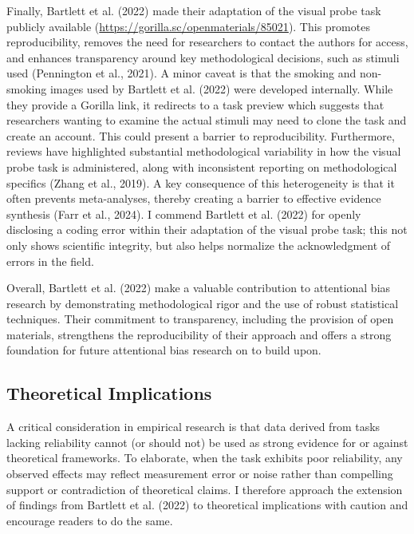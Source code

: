 \documentclass[authordate, reflection, issue]{jote-new-article}
\begin{document}
	Finally, Bartlett et al. (2022) made their adaptation of the visual probe task publicly available (\href{https://gorilla.sc/openmaterials/85021}{https://gorilla.sc/openmaterials/85021}). This promotes reproducibility, removes the need for researchers to contact the authors for access, and enhances transparency around key methodological decisions, such as stimuli used (Pennington et al., 2021). A minor caveat is that the smoking and non-smoking images used by Bartlett et al. (2022) were developed internally. While they provide a Gorilla link, it redirects to a task preview which suggests that researchers wanting to examine the actual stimuli may need to clone the task and create an account. This could present a barrier to reproducibility. Furthermore, reviews have highlighted substantial methodological variability in how the visual probe task is administered, along with inconsistent reporting on methodological specifics (Zhang et al., 2019). A key consequence of this heterogeneity is that it often prevents meta-analyses, thereby creating a barrier to effective evidence synthesis (Farr et al., 2024). I commend Bartlett et al. (2022) for openly disclosing a coding error within their adaptation of the visual probe task; this not only shows scientific integrity, but also helps normalize the acknowledgment of errors in the field.



	Overall, Bartlett et al. (2022) make a valuable contribution to attentional bias research by demonstrating methodological rigor and the use of robust statistical techniques. Their commitment to transparency, including the provision of open materials, strengthens the reproducibility of their approach and offers a strong foundation for future attentional bias research on to build upon.



	\subsection{Theoretical Implications}



	A critical consideration in empirical research is that data derived from tasks lacking reliability cannot (or should not) be used as strong evidence for or against theoretical frameworks. To elaborate, when the task exhibits poor reliability, any observed effects may reflect measurement error or noise rather than compelling support or contradiction of theoretical claims. I therefore approach the extension of findings from Bartlett et al. (2022) to theoretical implications with caution and encourage readers to do the same.
\end{document}

